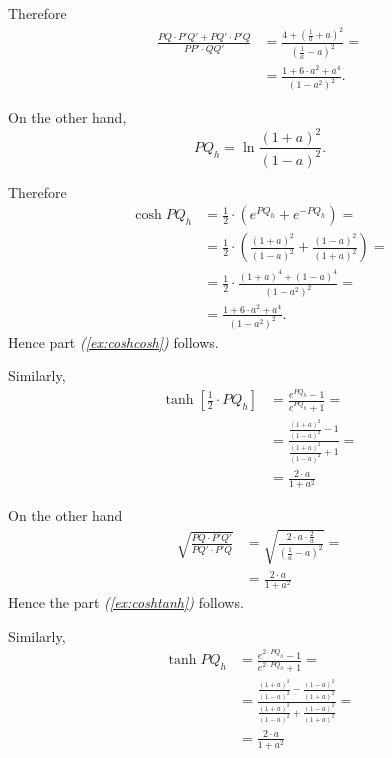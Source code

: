 Therefore
\begin{align*}
\frac{PQ\cdot  P'Q'+PQ'\cdot  P'Q}{PP'\cdot QQ'}
&=\frac{4+(\tfrac1a+a)^2}{(\tfrac1a-a)^2}=
\\
&=\frac{1+ 6\cdot a^2+a^4}{(1-a^2)^2}.
\end{align*}

On the other hand,
\[PQ_h=\ln \frac{(1+a)^2}{(1-a)^2}.\]

Therefore 
\begin{align*}\cosh PQ_h &=\tfrac12\cdot\left(e^{PQ_h}+e^{-PQ_h}\right)=
\\
&=\tfrac12\cdot\left(\frac{(1+a)^2}{(1-a)^2}+\frac{(1-a)^2}{(1+a)^2}\right)=
\\
&=\tfrac12\cdot\frac{(1+a)^4+(1-a)^4}{(1-a^2)^2}=
\\
&=\frac{1+6\cdot a^2 +a^4}{(1-a^2)^2}.
\end{align*}
Hence part \textit{(\ref{ex:coshcosh})} follows.

Similarly,
\begin{align*}
\tanh[\tfrac12\cdot PQ_h] &=\frac{e^{PQ_h}-1}{e^{PQ_h}+1}=
\\
&=\frac{\frac{(1+a)^2}{(1-a)^2}-1}{\frac{(1+a)^2}{(1-a)^2}+1}=
\\
&=\frac{2\cdot a}{1+a^2}
\end{align*}

On the other hand
\begin{align*}
\sqrt{\frac{PQ\cdot  P'Q'}{PQ'\cdot P'Q}}
&=\sqrt{\frac{2\cdot a\cdot \frac 2a}{(\tfrac1a-a)^2}}=
\\
&=\frac{2\cdot a}{1+a^2}
\end{align*}
Hence the part \textit{(\ref{ex:coshtanh})} follows.

























Similarly,
\begin{align*}
\tanh PQ_h &=\frac{e^{2\cdot PQ_h}-1}{e^{2\cdot PQ_h}+1}=
\\
&=\frac{\frac{(1+a)^2}{(1-a)^2}-\frac{(1-a)^2}{(1+a)^2}}{\frac{(1+a)^2}{(1-a)^2}+\frac{(1-a)^2}{(1+a)^2}}=
\\
&=\frac{2\cdot a}{1+a^2}
\end{align*}



